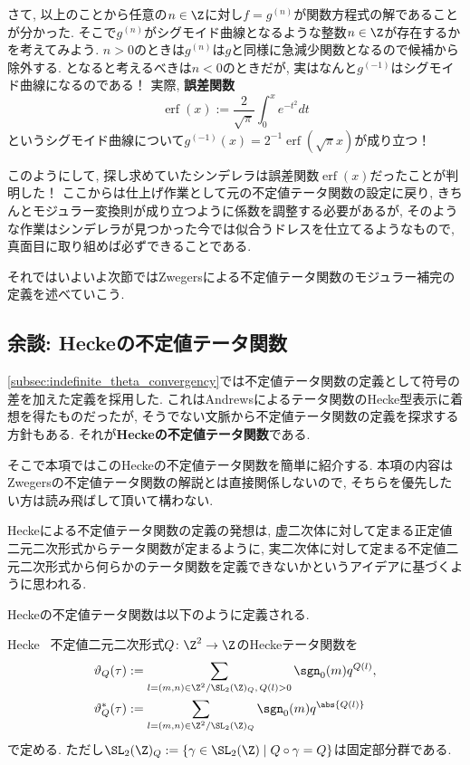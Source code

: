 \documentclass[11pt,b5paper,oneside,lualatex]{ltjsarticle} %
\DeclareMathOperator{\erf}{erf}
\numberwithin{equation}{section} %
\begin{document}
さて, 以上のことから任意の$ n \in \Z $に対し$ f = g^{(n)} $が関数方程式の解であることが分かった. 
そこで$ g^{(n)} $がシグモイド曲線となるような整数$ n \in \Z $が存在するかを考えてみよう. 
$ n>0 $のときは$ g^{(n)} $は$ g $と同様に急減少関数となるので候補から除外する. 
となると考えるべきは$ n < 0 $のときだが, 実はなんと$ g^{(-1)} $はシグモイド曲線になるのである！
実際, \textbf{誤差関数}
\[
\erf(x) := \frac{2}{\sqrt{\pi}} \int_{0}^{x} e^{-t^2} dt
\]
というシグモイド曲線について$ g^{(-1)} (x) = 2^{-1} \erf(\sqrt{\pi} x) $が成り立つ！

このようにして, 探し求めていたシンデレラは誤差関数$ \erf(x) $だったことが判明した！
ここからは仕上げ作業として元の不定値テータ関数の設定に戻り, きちんとモジュラー変換則が成り立つように係数を調整する必要があるが, そのような作業はシンデレラが見つかった今では似合うドレスを仕立てるようなもので, 真面目に取り組めば必ずできることである. 

それではいよいよ次節ではZwegersによる不定値テータ関数のモジュラー補完の定義を述べていこう. 




\subsection{余談: Heckeの不定値テータ関数} \label{subsec:Hecke_theta}


\cref{subsec:indefinite_theta_convergency}では不定値テータ関数の定義として符号の差を加えた定義を採用した. 
これはAndrewsによるテータ関数のHecke型表示に着想を得たものだったが, そうでない文脈から不定値テータ関数の定義を探求する方針もある. 
それが\textbf{Heckeの不定値テータ関数}である. 

そこで本項ではこのHeckeの不定値テータ関数を簡単に紹介する. 
本項の内容はZwegersの不定値テータ関数の解説とは直接関係しないので, そちらを優先したい方は読み飛ばして頂いて構わない. 

Heckeによる不定値テータ関数の定義の発想は, 虚二次体に対して定まる正定値二元二次形式からテータ関数が定まるように, 実二次体に対して定まる不定値二元二次形式から何らかのテータ関数を定義できないかというアイデアに基づくように思われる. 

Heckeの不定値テータ関数は以下のように定義される. 

\begin{dfn}{{Hecke~\cite{Hecke}}}{}
	不定値二元二次形式$ Q \colon \Z^2 \to \Z $のHeckeテータ関数を
	\begin{align}
		\vartheta_Q (\tau) 
		&:=
		\sum_{l = (m, n) \in \Z^2 / \SL_2(\Z)_Q, \, Q(l) > 0} \sgn_0(m) q^{Q(l)}, 
		\\
		\vartheta_Q^* (\tau)
		&:=
		\sum_{l = (m, n) \in \Z^2 / \SL_2(\Z)_Q} \sgn_0(m) q^{\abs{Q(l)}}
	\end{align}
	で定める. 
	ただし$ \SL_2(\Z)_Q := \{ \gamma \in \SL_2(\Z) \mid Q \circ \gamma = Q \} $は固定部分群である. 
\end{dfn}
\end{document}
